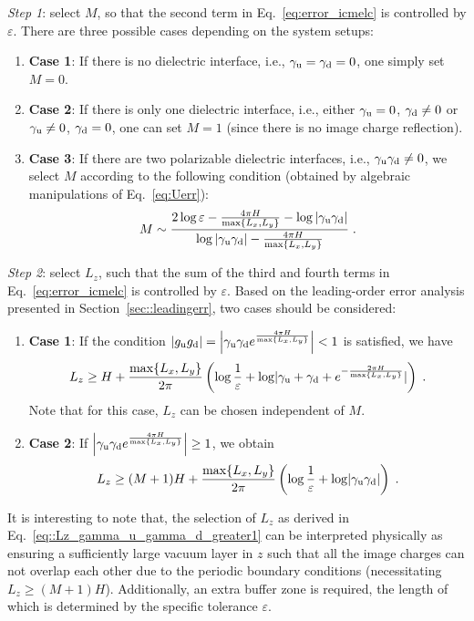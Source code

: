 \emph{Step 1}: select $M$, so that the second term in Eq.~\eqref{eq:error_icmelc} is controlled by $\varepsilon$. 
There are three possible cases depending on the system setups:
\begin{enumerate}
    \item \textbf{Case 1}: If there is no dielectric interface, i.e., $\gamma_{\text{u}}=\gamma_{\text{d}}=0$, one simply set $M=0$.
    \item \textbf{Case 2}: If there is only one dielectric interface, i.e., either $\gamma_{\text{u}}=0$,$~\gamma_{\text{d}}\neq 0$ or $\gamma_{\text{u}}\neq 0$,$~\gamma_{\text{d}}=0$, one can set $M=1$ (since there is no image charge reflection).
    \item \textbf{Case 3}: If there are two polarizable dielectric interfaces, i.e., $\gamma_{\text{u}}\gamma_{\text{d}}\neq 0$, we select $M$ according to the following condition (obtained by algebraic manipulations of Eq.~\eqref{eq:Uerr}):
    \begin{equation}\label{eq::38}
    M\sim \frac{2\log \varepsilon - \frac{4\pi H}{\max\{L_x,L_y\}} - \log|\gamma_{\text{u}} \gamma_{\text{d}}|}{\log|\gamma_{\text{u}} \gamma_{\text{d}}| - \frac{4\pi H}{\max\{L_x,L_y\}}}\;.
\end{equation}
\end{enumerate}

\emph{Step 2}: select $L_z$, such that the sum of the third and fourth terms in Eq.~\eqref{eq:error_icmelc} is controlled by $\varepsilon$. 
Based on the leading-order error analysis presented in Section~\ref{sec::leadingerr}, two cases should be considered: 
\begin{enumerate}
    \item \textbf{Case 1}: If the condition $|g_{\text{u}}g_{\text{d}}|=\left|\gamma_{\text{u}}\gamma_{\text{d}}e^{\frac{4\pi H}{\max\{L_x,L_y\}}}\right|<1$
is satisfied, we have
\begin{equation}\label{eq::Lz_gamma_u_gamma_d_less1}
    L_z \geq H + \frac{\max\{L_x,L_y\}}{2\pi} \left( \log\frac{1}{\varepsilon} + \log \lvert\gamma_{\text{u}} + \gamma_{\text{d}} + e^{- \frac{2\pi H}{\max\{L_x,L_y\}}}\rvert \right)\;.
\end{equation}
Note that for this case, $L_z$ can be chosen independent of $M$.
\item \textbf{Case 2}: If $\left|\gamma_{\text{u}}\gamma_{\text{d}}e^{\frac{4\pi H}{\max\{L_x,L_y\}}}\right|\geq 1$, we obtain
\begin{equation}\label{eq::Lz_gamma_u_gamma_d_greater1}
    L_z \geq (M + 1) H + \frac{\max\{L_x,L_y\}}{2\pi} \left( \log\frac{1}{\varepsilon} + \log \lvert\gamma_{\text{u}} \gamma_{\text{d}}\rvert \right)\;.
\end{equation}
\end{enumerate}
It is interesting to note that, the selection of $L_z$ as derived in Eq.~\eqref{eq::Lz_gamma_u_gamma_d_greater1} can be interpreted physically as ensuring a sufficiently large vacuum layer in $z$ such that all the image charges can not overlap each other due to the periodic boundary conditions (necessitating $L_z\geq (M+1)H$). Additionally, an extra buffer zone is required, the length of which is determined by the specific tolerance $\varepsilon$.

